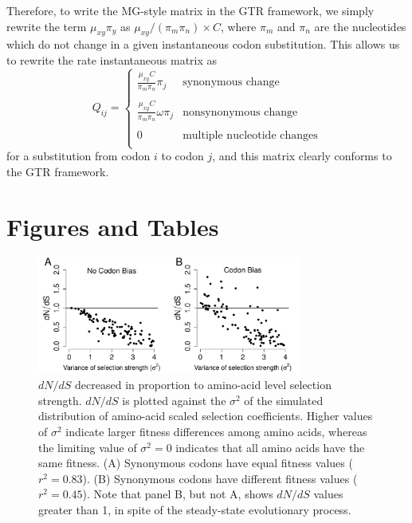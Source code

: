 \documentclass[11pt]{article}
\begin{document}
Therefore, to write the MG-style matrix in the GTR framework, we simply rewrite the term $\mu_{xy}\pi_y$ as $\mu_{xy} / (\pi_m\pi_n) \times C$, where $\pi_m$ and $\pi_n$ are the nucleotides which do not change in a given instantaneous codon substitution. This allows us to rewrite the rate instantaneous matrix as 
\begin{equation}
Q_{ij} = \left\{ 
\begin{array}{rl}
\frac{\mu_{xy}C}{\pi_m\pi_n}\pi_j               &\mbox{synonymous change} \\\\
\frac{\mu_{xy}C}{\pi_m\pi_n}\omega\pi_j         &\mbox{nonsynonymous change} \\\\
0                                                     &\mbox{multiple nucleotide changes} \\           
\end{array} \right.
\end{equation} for a substitution from codon $i$ to codon $j$, and this matrix clearly conforms to the GTR framework.
		
		

		
		


		
		
	
	
\section*{Figures and Tables}

\vspace{2cm}
	
\begin{figure}[htbp]
	\centerline{\includegraphics[width=8.7cm]{figures/MainText/dnds_variance.pdf}}
	\caption{\label{dnds_variance} $dN/dS$ decreased in proportion to amino-acid level selection strength. $dN/dS$ is plotted against the $\sigma^2 $ of the simulated distribution of amino-acid scaled selection coefficients. Higher values of $\sigma^2$ indicate larger fitness differences among amino acids, whereas the limiting value of $\sigma^2 = 0$ indicates that all amino acids have the same fitness. (A) Synonymous codons have equal fitness values ($r^2=0.83$). (B) Synonymous codons have different fitness values ($r^2=0.45$). Note that panel B, but not A, shows $dN/dS$ values greater than 1, in spite of the steady-state evolutionary process.}
\end{figure}
		
\end{document}
